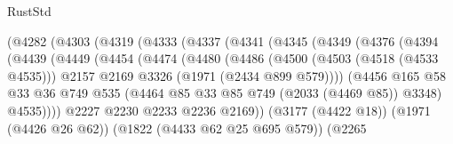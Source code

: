 \begin{lexlean}{RustStd}
\begin{coremodule}
{\begin{coremodule}
{{{{{{{{{{{{{                        (@4282
                          (@4303
                            (@4319
                              (@4333
                                (@4337
                                  (@4341
                                    (@4345
                                      (@4349
                                        (@4376
                                          (@4394
                                            (@4439
                                              (@4449
                                                (@4454
                                                  (@4474
                                                    (@4480
                                                      (@4486
                                                        (@4500
                                                          (@4503 (@4518 (@4533 @4535)))
                                                          @2157
                                                          @2169
                                                          @3326
                                                          (@1971 (@2434 @899 @579))))
                                                      (@4456
                                                        @165
                                                        @58
                                                        @33
                                                        @36
                                                        @749
                                                        @535
                                                        (@4464
                                                          @85
                                                          @33
                                                          @85
                                                          @749
                                                          (@2033 (@4469 @85))
                                                          @3348)
                                                        @4535))))
                                                @2227
                                                @2230
                                                @2233
                                                @2236
                                                @2169))
                                            (@3177 (@4422 @18))
                                            (@1971 (@4426 @26 @62))
                                            (@1822 (@4433 @62 @25 @695 @579))
                                            (@2265
}}}}}}}}}}}}}
\end{coremodule}}
\end{coremodule}
\end{lexlean}
